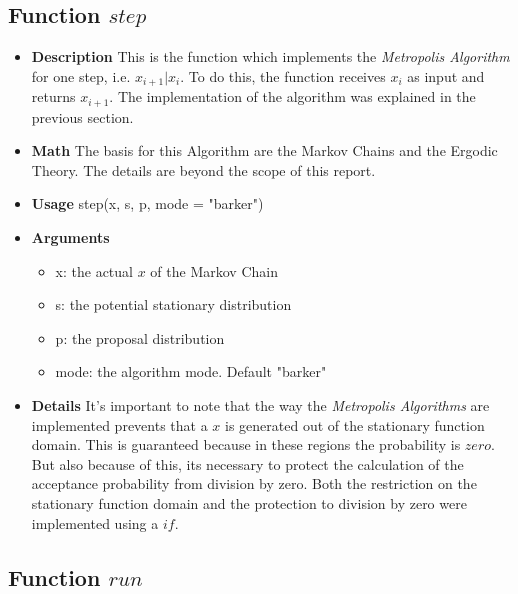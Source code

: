 \documentclass{article}
\begin{document}
\subsection{Function $step$}

\begin{itemize}
    \item \textbf{Description}\newline
    This is the function which implements the \textit{Metropolis Algorithm} for one step, i.e. $x_{i+1}|x_i$. To do this, the function receives $x_i$ as input and returns $x_{i+1}$. The implementation of the algorithm was explained in the previous section.
    
    \item \textbf{Math}\newline
    The basis for this Algorithm are the Markov Chains and the Ergodic Theory. The details are beyond the scope of this report.
    
    \item \textbf{Usage}\newline
    step(x, s, p, mode = "barker")
    
    \item \textbf{Arguments}
    
    \begin{itemize}
        \item x: the actual $x$ of the Markov Chain 
        \item s: the potential stationary distribution 
        \item p: the proposal distribution
        \item mode: the algorithm mode. Default "barker"
    \end{itemize}
    \item \textbf{Details}\newline
    It's important to note that the way the \textit{Metropolis Algorithms} are implemented prevents that a $x$ is generated out of the stationary function domain. This is guaranteed because in these regions the probability is $zero$. But also because of this, its necessary to protect the calculation of the acceptance probability from division by zero. Both the restriction on the stationary function domain and the protection to division by zero were implemented using a $if$.

\end{itemize}

\subsection{Function $run$}
\end{document}
